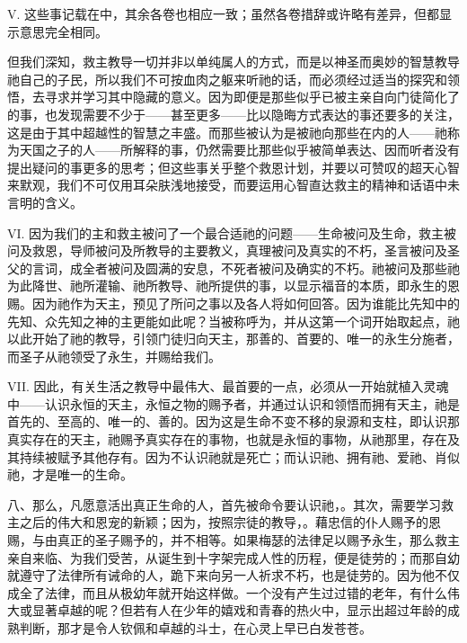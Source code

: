 V. 这些事记载在中，其余各卷也相应一致；虽然各卷措辞或许略有差异，但都显示意思完全相同。\par

但我们深知，救主教导一切并非以单纯属人的方式，而是以神圣而奥妙的智慧教导祂自己的子民，所以我们不可按血肉之躯来听祂的话，而必须经过适当的探究和领悟，去寻求并学习其中隐藏的意义。因为即便是那些似乎已被主亲自向门徒简化了的事，也发现需要不少于——甚至更多——比以隐晦方式表达的事还要多的关注，这是由于其中超越性的智慧之丰盛。而那些被认为是被祂向那些在内的人——祂称为天国之子的人——所解释的事，仍然需要比那些似乎被简单表达、因而听者没有提出疑问的事更多的思考；但这些事关乎整个救恩计划，并要以可赞叹的超天心智来默观，我们不可仅用耳朵肤浅地接受，而要运用心智直达救主的精神和话语中未言明的含义。\par

VI. 因为我们的主和救主被问了一个最合适祂的问题——生命被问及生命，救主被问及救恩，导师被问及所教导的主要教义，真理被问及真实的不朽，圣言被问及圣父的言词，成全者被问及圆满的安息，不死者被问及确实的不朽。祂被问及那些祂为此降世、祂所灌输、祂所教导、祂所提供的事，以显示福音的本质，即永生的恩赐。因为祂作为天主，预见了所问之事以及各人将如何回答。因为谁能比先知中的先知、众先知之神的主更能如此呢？当被称呼为，并从这第一个词开始取起点，祂以此开始了祂的教导，引领门徒归向天主，那善的、首要的、唯一的永生分施者，而圣子从祂领受了永生，并赐给我们。\par

VII. 因此，有关生活之教导中最伟大、最首要的一点，必须从一开始就植入灵魂中——认识永恒的天主，永恒之物的赐予者，并通过认识和领悟而拥有天主，祂是首先的、至高的、唯一的、善的。因为这是生命不变不移的泉源和支柱，即认识那真实存在的天主，祂赐予真实存在的事物，也就是永恒的事物，从祂那里，存在及其持续被赋予其他存有。因为不认识祂就是死亡；而认识祂、拥有祂、爱祂、肖似祂，才是唯一的生命。\par

八、那么，凡愿意活出真正生命的人，首先被命令要认识祂，。其次，需要学习救主之后的伟大和恩宠的新颖；因为，按照宗徒的教导，。藉忠信的仆人赐予的恩赐，与由真正的圣子赐予的，并不相等。如果梅瑟的法律足以赐予永生，那么救主亲自来临、为我们受苦，从诞生到十字架完成人性的历程，便是徒劳的；而那自幼就遵守了法律所有诫命的人，跪下来向另一人祈求不朽，也是徒劳的。因为他不仅成全了法律，而且从极幼年就开始这样做。一个没有产生过过错的老年，有什么伟大或显著卓越的呢？但若有人在少年的嬉戏和青春的热火中，显示出超过年龄的成熟判断，那才是令人钦佩和卓越的斗士，在心灵上早已白发苍苍。\par

